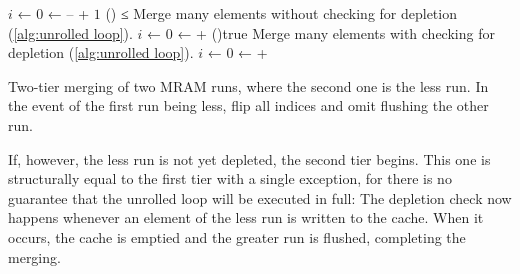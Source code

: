 \SetArgSty{}
\SetFuncArgSty{}




\begin{algorithm*}[!t]

	\(i\) ← \(0\)  
	\Early ←  – \Factor + \(1\)\;
	\While(){ ≤ \Early}{
		Merge \Factor many elements \linebreak without checking for depletion (\cref{alg:unrolled loop}).\;
		\;
		\(i\) ← \(0\)\;
		\Out ← \Out + \Length\;
	}
	\While(){true}{
		Merge \Factor many elements \linebreak with checking for depletion (\cref{alg:unrolled loop}).\;
		\;
		\(i\) ← \(0\)\;
		\Out ← \Out + \Length\;
	}

	\caption{
		Two-tier merging of two MRAM runs, where the second one is the less run.
		In the event of the first run being less, flip all indices and omit flushing the other run.
	}
	\label{alg:two-tier merge}
\end{algorithm*}

If, however, the less run is not yet depleted, the second tier begins.
This one is structurally equal to the first tier with a single exception, for there is no guarantee that the unrolled loop will be executed in full:
The depletion check now happens whenever an element of the less run is written to the cache.
When it occurs, the cache is emptied and the greater run is flushed, completing the merging.

